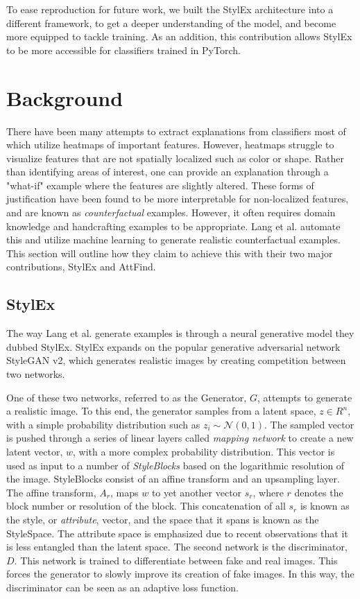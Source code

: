 To ease reproduction for future work, we built the StylEx architecture into a different framework, to get a deeper understanding of the model, and become more equipped to tackle training. As an addition, this contribution allows StylEx to be more accessible for classifiers trained in PyTorch.

\section{Background}
There have been many attempts to extract explanations from classifiers most of which utilize heatmaps of important features. However, heatmaps struggle to visualize features that are not spatially localized such as color or shape. Rather than identifying areas of interest, one can provide an explanation through a "what-if" example where the features are slightly altered. These forms of justification have been found to be more interpretable for non-localized features, and are known as \textit{counterfactual} examples. However, it often requires domain knowledge and handcrafting examples to be appropriate. Lang et al. automate this and utilize machine learning to generate realistic counterfactual examples. This section will outline how they claim to achieve this with their two major contributions, StylEx and AttFind.

\subsection{StylEx}

The way Lang et al. generate examples is through a neural generative model they dubbed StylEx. StylEx expands on the popular generative adversarial network StyleGAN v2, which generates realistic images by creating competition between two networks. 

One of these two networks, referred to as the Generator, $G$, attempts to generate a realistic image. To this end, the generator samples from a latent space, $z\in R^n$, with a simple probability distribution such as $z_i\sim \mathcal{N}(0,1)$. The sampled vector is pushed through a series of linear layers called \textit{mapping network} to create a new latent vector, $w$, with a more complex probability distribution. This vector is used as input to a number of \textit{StyleBlocks} based on the logarithmic resolution of the image. StyleBlocks consist of an affine transform and an upsampling layer. The affine transform, $A_r$, maps $w$ to yet another vector $s_r$, where $r$ denotes the block number or resolution of the block. This concatenation of all $s_r$ is known as the style, or \textit{attribute}, vector, and the space that it spans is known as the StyleSpace. The attribute space is emphasized due to recent observations that it is less entangled than the latent space. The second network is the discriminator, $D$. This network is trained to differentiate between fake and real images. This forces the generator to slowly improve its creation of fake images. In this way, the discriminator can be seen as an adaptive loss function.


